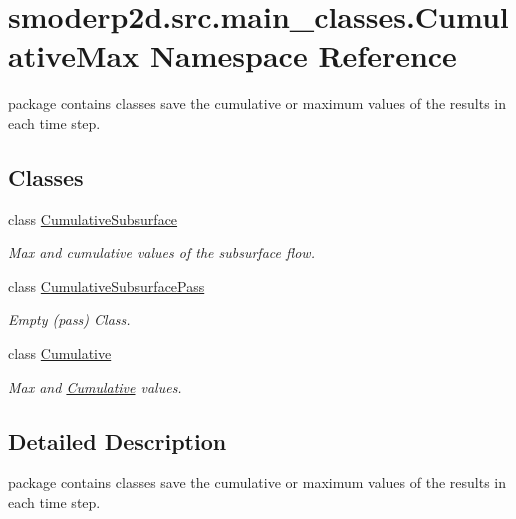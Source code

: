 \hypertarget{namespacesmoderp2d_1_1src_1_1main__classes_1_1CumulativeMax}{\section{smoderp2d.\-src.\-main\-\_\-classes.\-Cumulative\-Max Namespace Reference}
\label{namespacesmoderp2d_1_1src_1_1main__classes_1_1CumulativeMax}
}


package contains classes save the cumulative or maximum values of the results in each time step.  


\subsection*{Classes}
\begin{DoxyCompactItemize}
\item 
class \hyperlink{classsmoderp2d_1_1src_1_1main__classes_1_1CumulativeMax_1_1CumulativeSubsurface}{Cumulative\-Subsurface}
\begin{DoxyCompactList}\small\item\em Max and cumulative values of the subsurface flow. \end{DoxyCompactList}\item 
class \hyperlink{classsmoderp2d_1_1src_1_1main__classes_1_1CumulativeMax_1_1CumulativeSubsurfacePass}{Cumulative\-Subsurface\-Pass}
\begin{DoxyCompactList}\small\item\em Empty (pass) Class. \end{DoxyCompactList}\item 
class \hyperlink{classsmoderp2d_1_1src_1_1main__classes_1_1CumulativeMax_1_1Cumulative}{Cumulative}
\begin{DoxyCompactList}\small\item\em Max and \hyperlink{classsmoderp2d_1_1src_1_1main__classes_1_1CumulativeMax_1_1Cumulative}{Cumulative} values. \end{DoxyCompactList}\end{DoxyCompactItemize}


\subsection{Detailed Description}
package contains classes save the cumulative or maximum values of the results in each time step. 